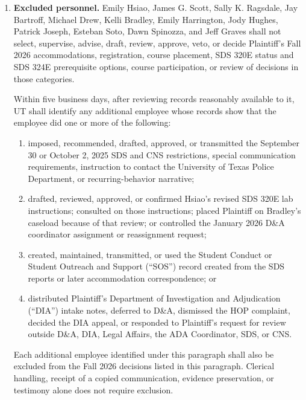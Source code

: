 \documentclass[12pt]{article}
\begin{document}
\begin{enumerate}
\item \textbf{Excluded personnel.} Emily Hsiao, James G. Scott, Sally K. Ragsdale, Jay Bartroff, Michael Drew, Kelli Bradley, Emily Harrington, Jody Hughes, Patrick Joseph, Esteban Soto, Dawn Spinozza, and Jeff Graves shall not select, supervise, advise, draft, review, approve, veto, or decide Plaintiff's Fall 2026 accommodations, registration, course placement, SDS 320E status and SDS 324E prerequisite options, course participation, or review of decisions in those categories.

Within five business days, after reviewing records reasonably available to it, UT shall identify any additional employee whose records show that the employee did one or more of the following:

  \begin{enumerate}[label=(\alph*),leftmargin=0.45in]
  \item imposed, recommended, drafted, approved, or transmitted the September 30 or October 2, 2025 SDS and CNS restrictions, special communication requirements, instruction to contact the University of Texas Police Department, or recurring-behavior narrative;

  \item drafted, reviewed, approved, or confirmed Hsiao's revised SDS 320E lab instructions; consulted on those instructions; placed Plaintiff on Bradley's caseload because of that review; or controlled the January 2026 D\&A coordinator assignment or reassignment request;

  \item created, maintained, transmitted, or used the Student Conduct or Student Outreach and Support (``SOS'') record created from the SDS reports or later accommodation correspondence; or

  \item distributed Plaintiff's Department of Investigation and Adjudication (``DIA'') intake notes, deferred to D\&A, dismissed the HOP complaint, decided the DIA appeal, or responded to Plaintiff's request for review outside D\&A, DIA, Legal Affairs, the ADA Coordinator, SDS, or CNS.
  \end{enumerate}

Each additional employee identified under this paragraph shall also be excluded from the Fall 2026 decisions listed in this paragraph. Clerical handling, receipt of a copied communication, evidence preservation, or testimony alone does not require exclusion.


\end{enumerate}
\end{document}
